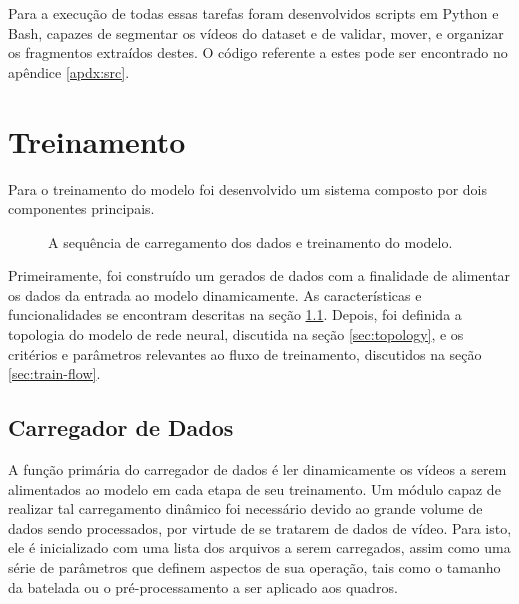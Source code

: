 
Para a execução de todas essas tarefas foram desenvolvidos scripts em Python e Bash, capazes de segmentar os vídeos do dataset e de validar, mover, e organizar os fragmentos extraídos destes.
O código referente a estes pode ser encontrado no apêndice \ref{apdx:src}.

\section{Treinamento}
\label{sec:train}

Para o treinamento do modelo foi desenvolvido um sistema composto por dois componentes principais.

\begin{figure}[ht]
    \centering
    \fontsize{10pt}{10pt}\selectfont
    
    \caption{A sequência de carregamento dos dados e treinamento do modelo.}
    \label{fig:arch_train}
\end{figure}

Primeiramente, foi construído um gerados de dados com a finalidade de alimentar os dados da entrada ao modelo dinamicamente. As características e funcionalidades se encontram descritas na seção \ref{sec:data-gen}.
Depois, foi definida a topologia do modelo de rede neural, discutida na seção \ref{sec:topology}, e os critérios e parâmetros relevantes ao fluxo de treinamento, discutidos na seção \ref{sec:train-flow}.

\subsection{Carregador de Dados}
\label{sec:data-gen}
A função primária do carregador de dados é ler dinamicamente os vídeos a serem alimentados ao modelo em cada etapa de seu treinamento.
Um módulo capaz de realizar tal carregamento dinâmico foi necessário devido ao grande volume de dados sendo processados, por virtude de se tratarem de dados de vídeo.
Para isto, ele é inicializado com uma lista dos arquivos a serem carregados, assim como uma série de parâmetros que definem aspectos de sua operação, tais como o tamanho da batelada ou o pré-processamento a ser aplicado aos quadros.

